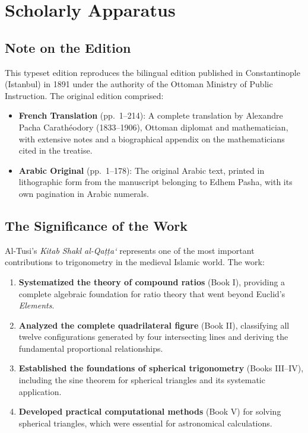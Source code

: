 \documentclass[11pt,a4paper]{article}
\theoremstyle{plain}
\theoremstyle{definition}
\theoremstyle{remark}
\begin{document}
\section*{Scholarly Apparatus}

\subsection*{Note on the Edition}

This typeset edition reproduces the bilingual edition published in Constantinople (Istanbul) in 1891 under the authority of the Ottoman Ministry of Public Instruction. The original edition comprised:

\begin{itemize}
\item \textbf{French Translation} (pp.~1--214): A complete translation by Alexandre Pacha Carath\'eodory (1833--1906), Ottoman diplomat and mathematician, with extensive notes and a biographical appendix on the mathematicians cited in the treatise.
\item \textbf{Arabic Original} (pp.~1--178): The original Arabic text, printed in lithographic form from the manuscript belonging to Edhem Pasha, with its own pagination in Arabic numerals.
\end{itemize}

\subsection*{The Significance of the Work}

Al-Tusi's \textit{Kitab Shakl al-Qa\d{t}\d{t}a`} represents one of the most important contributions to trigonometry in the medieval Islamic world. The work:

\begin{enumerate}
\item \textbf{Systematized the theory of compound ratios} (Book I), providing a complete algebraic foundation for ratio theory that went beyond Euclid's \textit{Elements}.
\item \textbf{Analyzed the complete quadrilateral figure} (Book II), classifying all twelve configurations generated by four intersecting lines and deriving the fundamental proportional relationships.
\item \textbf{Established the foundations of spherical trigonometry} (Books III--IV), including the sine theorem for spherical triangles and its systematic application.
\item \textbf{Developed practical computational methods} (Book V) for solving spherical triangles, which were essential for astronomical calculations.
\end{enumerate}
\end{document}

